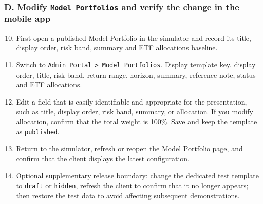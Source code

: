 \subsubsection{D. Modify \texttt{Model Portfolios} and verify the change in the mobile app}
\begin{enumerate}
\setcounter{enumi}{9}
\item First open a published Model Portfolio in the simulator and record its title, display order, risk band, summary and ETF allocations baseline.
\item Switch to \texttt{Admin Portal \textgreater{} Model Portfolios}. Display template key, display order, title, risk band, return range, horizon, summary, reference note, status and ETF allocations.
\item Edit a field that is easily identifiable and appropriate for the presentation, such as title, display order, risk band, summary, or allocation. If you modify allocation, confirm that the total weight is 100\%. Save and keep the template as \texttt{published}.
\item Return to the simulator, refresh or reopen the Model Portfolio page, and confirm that the client displays the latest configuration.
\item Optional supplementary release boundary: change the dedicated test template to \texttt{draft} or \texttt{hidden}, refresh the client to confirm that it no longer appears; then restore the test data to avoid affecting subsequent demonstrations.
\end{enumerate}
